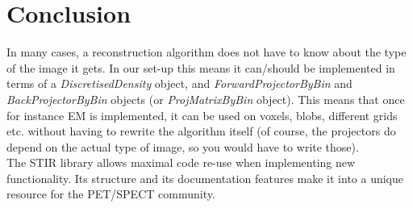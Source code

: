 \documentclass{article}
\begin{document}
\section{
Conclusion}

In many cases, a reconstruction algorithm does not have to know 
about the type of the image it gets. In our set-up this means 
it can/should be implemented in terms of a \textit{DiscretisedDensity} 
object, and \textit{ForwardProjectorByBin} and \textit{BackProjectorByBin} 
objects (or \textit{ProjMatrixByBin} object). This means that once 
for instance EM is implemented, it can be used on voxels, blobs, 
different grids etc. without having to rewrite the algorithm 
itself (of course, the projectors do depend on the actual type 
of image, so you would have to write those).\\
The STIR library allows maximal code re-use when implementing 
new functionality. Its structure and its documentation features 
make it into a unique resource for the PET/SPECT community. 
\end{document}
